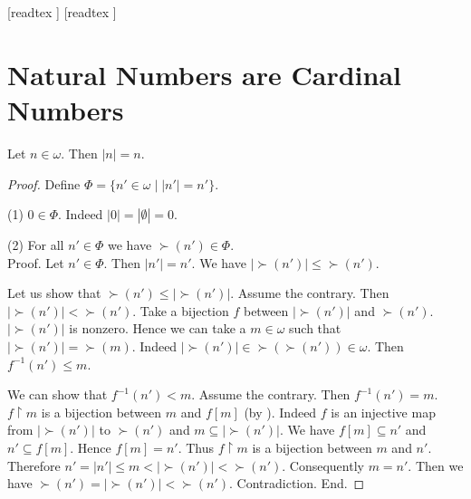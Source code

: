 \documentclass[10pt]{article}
\begin{document}
  \begin{imports}
    \begin{forthel}
      [readtex ]
      [readtex ]
    \end{forthel}
  \end{imports}


  \section*{Natural Numbers are Cardinal Numbers}

  \begin{forthel}
    \begin{theorem}[id=SET_THEORY_07_2948332552978432,printid]
      Let $n \in \omega$.
      Then $|n| = n$.
    \end{theorem}
    \begin{proof}
      Define $\Phi = \{ n' \in \omega \mid |n'| = n' \}$.

      (1) $0 \in \Phi$.
      Indeed $|0| = |\emptyset| = 0$.

      (2) For all $n' \in \Phi$ we have $\succ(n') \in \Phi$. \\
      Proof.
        Let $n' \in \Phi$.
        Then $|n'| = n'$.
        We have $|\succ(n')| \leq \succ(n')$.

        Let us show that $\succ(n') \leq |\succ(n')|$.
          Assume the contrary.
          Then $|\succ(n')| < \succ(n')$.
          Take a bijection $f$ between $|\succ(n')|$ and $\succ(n')$.
          $|\succ(n')|$ is nonzero.
          Hence we can take a $m \in \omega$ such that $|\succ(n')| = \succ(m)$.
          Indeed $|\succ(n')| \in \succ(\succ(n')) \in \omega$.
          Then $f^{-1}(n') \leq m$.

          We can show that $f^{-1}(n') < m$.
            Assume the contrary.
            Then $f^{-1}(n') = m$.
            $f \restriction m$ is a bijection between $m$ and $f[m]$ (by ).
            Indeed $f$ is an injective map from $|\succ(n')|$ to $\succ(n')$ and
            $m \subseteq |\succ(n')|$.
            We have $f[m] \subseteq n'$ and $n' \subseteq f[m]$.
            Hence $f[m] = n'$.
            Thus $f \restriction m$ is a bijection between $m$ and $n'$.
            Therefore $n'
              = |n'|
              \leq m
              < |\succ(n')|
              < \succ(n')$.
            Consequently $m = n'$.
            Then we have $\succ(n') = |\succ(n')| < \succ(n')$.
            Contradiction.
          End.


\end{proof}
\end{forthel}
\end{document}
